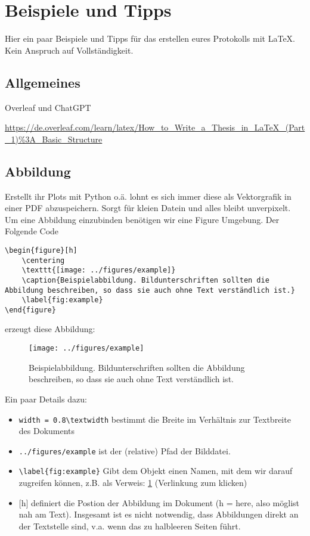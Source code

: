 \documentclass[twoside, 11pt, ngerman, a4paper, biblography=totoc]{scrartcl}
\begin{document}
\section{Beispiele und Tipps}
Hier ein paar Beispiele und Tipps für das erstellen eures Protokolls mit \LaTeX. Kein Anspruch auf Vollständigkeit.

\subsection{Allgemeines}
Overleaf und ChatGPT

\url{https://de.overleaf.com/learn/latex/How_to_Write_a_Thesis_in_LaTeX_(Part_1)\%3A_Basic_Structure}

\subsection{Abbildung}
Erstellt ihr Plots mit Python o.ä. lohnt es sich immer diese als Vektorgrafik in einer PDF abzuspeichern. Sorgt für kleien Datein und alles bleibt unverpixelt.\\

Um eine Abbildung einzubinden benötigen wir eine Figure Umgebung. Der Folgende Code
\begin{lstlisting}[language=Tex]
\begin{figure}[h]
    \centering
    \texttt{[image: ../figures/example]}
    \caption{Beispielabbildung. Bildunterschriften sollten die Abbildung beschreiben, so dass sie auch ohne Text verständlich ist.}
    \label{fig:example}
\end{figure}
\end{lstlisting}
erzeugt diese Abbildung:
\begin{figure}[h]
    \centering
    \texttt{[image: ../figures/example]}
    \caption{Beispielabbildung. Bildunterschriften sollten die Abbildung beschreiben, so dass sie auch ohne Text verständlich ist.}
    \label{fig:example}
\end{figure}

Ein paar Details dazu:
\begin{itemize}
	\item \texttt{width = 0.8\textbackslash textwidth} bestimmt die Breite im Verhältnis zur Textbreite des Dokuments
	\item \texttt{../figures/example} ist der (relative) Pfad der Bilddatei. 
	\item \texttt{\textbackslash label\{fig:example\}} Gibt dem Objekt einen Namen, mit dem wir darauf zugreifen können, z.B. als Verweis: \cref{fig:example} (Verlinkung zum klicken)
	\item $[$h$]$ definiert die Postion der Abbildung im Dokument (h = here, also möglist nah am Text). Insgesamt ist es nicht notwendig, dass Abbildungen direkt an der Textstelle sind, v.a. wenn das zu halbleeren Seiten führt.
\end{itemize}
\end{document}
